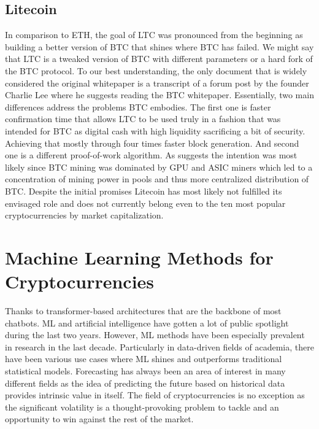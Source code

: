 \subsection{Litecoin}
In comparison to \ac{ETH}, the goal of \ac{LTC} was pronounced from the 
beginning as building a better version of \ac{BTC} that shines where
\ac{BTC} has failed. We might say that \ac{LTC} is a tweaked version of \ac{BTC} with 
different parameters or a hard fork of the \ac{BTC} protocol. 
To our best understanding, the only document that 
is widely considered the original whitepaper is a transcript of a forum
post by the founder Charlie Lee where he suggests reading 
the \ac{BTC} whitepaper.
Essentially, two main differences address the problems
\ac{BTC} embodies. The first one is faster confirmation time that allows 
\ac{LTC} to be used truly in a fashion that was intended for \ac{BTC} as 
digital cash with high liquidity sacrificing a bit of security. Achieving
that mostly through four times faster block generation. And second one 
is a different proof-of-work algorithm. As \cite{Padmavathi2018} suggests
the intention was most likely since \ac{BTC} mining
was dominated by GPU and ASIC miners which led to a concentration of mining power
in pools and thus more centralized distribution of \ac{BTC}. Despite the initial
promises Litecoin has most likely not fulfilled its envisaged role
and does not currently belong even to the ten most popular cryptocurrencies
by market capitalization.


\section{Machine Learning Methods for Cryptocurrencies}
\label{sec:ml}
Thanks to transformer-based architectures that are the backbone 
of most chatbots. \ac{ML} and artificial intelligence have gotten a lot
of public spotlight during the last two years. However, \ac{ML} methods
have been especially prevalent in research in the last decade.
Particularly in data-driven fields of academia, there have been various
use cases where \ac{ML} shines and outperforms traditional statistical models.
Forecasting has always been an area of interest in many different fields
as the idea of predicting the future based on historical data 
provides intrinsic value in itself.
The field of cryptocurrencies is no exception as the significant volatility
is a thought-provoking problem to tackle and an opportunity to 
win against the rest of the market.


